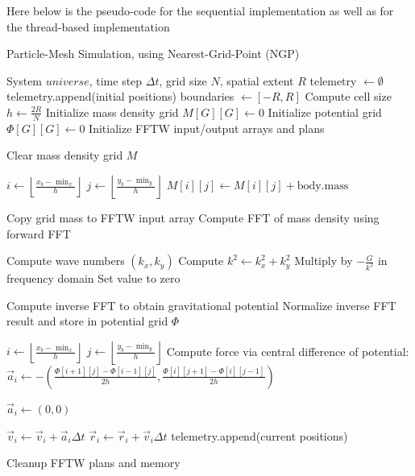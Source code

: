 \documentclass{article}
\begin{document}
Here below is the pseudo-code for the sequential implementation as well as for the thread-based implementation
\begin{algorithm}[H]
\caption{Particle-Mesh Simulation, using Nearest-Grid-Point (NGP)}
\begin{algorithmic}[1]
\Require System $universe$, time step $\Delta t$, grid size $N$, spatial extent $R$
\State telemetry $\gets \emptyset$
\State telemetry.append(initial positions)
\State boundaries $\gets [-R, R]$
\State Compute cell size $h \gets \frac{2R}{N}$
\State Initialize mass density grid $M[G][G] \gets 0$
\State Initialize potential grid $\Phi[G][G] \gets 0$
\State Initialize FFTW input/output arrays and plans

    \State Clear mass density grid $M$

        \State $i \gets \left\lfloor \frac{x_b - \min_x}{h} \right\rfloor$
        \State $j \gets \left\lfloor \frac{y_b - \min_y}{h} \right\rfloor$        
            \State $M[i][j] \gets M[i][j] + \text{body.mass}$
        \EndIf
    \EndFor

    \State Copy grid mass to FFTW input array
    \State Compute FFT of mass density using forward FFT

        \State Compute wave numbers $(k_x, k_y)$
        \State Compute $k^2 \gets k_x^2 + k_y^2$
            \State Multiply by $-\frac{G}{k^2}$ in frequency domain
        \Else
            \State Set value to zero
        \EndIf
    \EndFor

    \State Compute inverse FFT to obtain gravitational potential
    \State Normalize inverse FFT result and store in potential grid $\Phi$

        \State $i \gets \left\lfloor \frac{x_b - \min_x}{h} \right\rfloor$
        \State $j \gets \left\lfloor \frac{y_b - \min_y}{h} \right\rfloor$
           \State Compute force via central difference of potential:
            \State $\vec{a}_i \gets -\left( \frac{\Phi[i+1][j] - \Phi[i-1][j]}{2h}, \frac{\Phi[i][j+1] - \Phi[i][j-1]}{2h} \right)$

        \Else
            \State $\vec{a}_i \gets (0, 0)$
        \EndIf
    \EndFor

        \State $\vec{v}_i \gets \vec{v}_i + \vec{a}_i \Delta t$ 
        \State $\vec{r}_i \gets \vec{r}_i + \vec{v}_i \Delta t$ 
    \EndFor
    \State telemetry.append(current positions)
\EndFor

\State Cleanup FFTW plans and memory
\end{algorithmic}
\end{algorithm}
\end{document}
